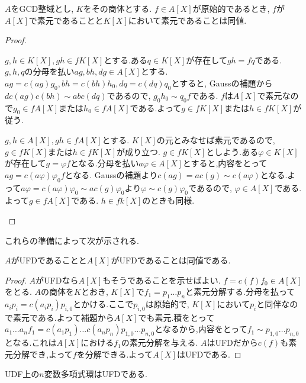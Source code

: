 \begin{lem}
	$A$をGCD整域とし, $K$をその商体とする. $f\in A[X]$が原始的であるとき, $f$が$A[X]$で素元であることと$K[X]$において素元であることは同値.
\end{lem}
\begin{proof}
	\begin{eqv}
		\item $g,h\in K[X], gh\in fK[X]$とする.ある$q\in K[X]$が存在して$gh=fq$である. $g,h,q$の分母を払い$ag,bh,dg\in A[X]$とする. $ag=c(ag)g_0,bh=c(bh)h_0,dq=c(dq)q_0$とすると, Gaussの補題から$d c(ag)c(bh)\sim ab c(dq)$であるので, $g_0h_0\sim q_0f$である. $f$は$A[X]$で素元なので$g_0\in fA[X]$または$h_0\in fA[X]$である.よって$g\in fK[X]$または$h\in fK[X]$が従う.
		
		\item $g,h\in A[X], gh\in fA[X]$とする. $K[X]$の元とみなせば素元であるので, $g\in fK[X]$または$h\in fK[X]$が成り立つ. $g\in fK[X]$としよう.ある$\varphi\in K[X]$が存在して$g=\varphi f$となる.分母を払い$a\varphi\in A[X]$とすると,内容をとって$ag=c(a\varphi)\varphi_0f$となる. Gaussの補題より$c(ag)=ac(g)\sim c(a\varphi)$となる.よって$a\varphi=c(a\varphi)\varphi_0\sim ac(g)\varphi_0$より$\varphi\sim c(g)\varphi_0$であるので, $\varphi\in A[X]$である.よって$g\in fA[X]$である. $h\in fk[X]$のときも同様.
	\end{eqv}
\end{proof}

これらの準備によって次が示される.

\begin{thm}
	$A$がUFDであることと$A[X]$がUFDであることは同値である.
\end{thm}

\begin{proof}
	$A$がUFDなら$A[X]$もそうであることを示せばよい. $f=c(f)f_0\in A[X]$をとる. $A$の商体を$K$とおき, $K[X]$で$f_1=p_1\dots p_n$と素元分解する.分母を払って$a_ip_i=c(a_ip_i)p_{i,0}$とかける.ここで$p_{i,0}$は原始的で, $K[X]$において$p_i$と同伴なので素元である.よって補題から$A[X]$でも素元.積をとって$a_1\dots a_n f_1=c(a_1p_1)\dots c(a_np_n)p_{1,0}\dots p_{n,0}$となるから,内容をとって$f_1\sim p_{1,0}\dots p_{n,0}$となる.これは$A[X]$における$f_1$の素元分解を与える. $A$はUFDだから$c(f)$も素元分解でき,よって$f$を分解できる.よって$A[X]$はUFDである.
\end{proof}

\begin{cor}\label{cor:多変数もUFD}
	UDF上の$n$変数多項式環はUFDである.
\end{cor}


